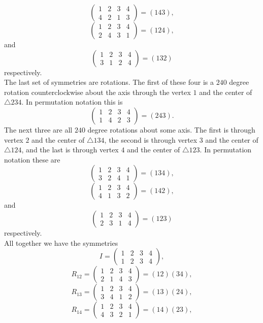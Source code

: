 \documentclass[11pt,a4paper]{article}
\begin{document}
\[\begin{pmatrix}1&2&3&4\\4&2&1&3\end{pmatrix} = (143),\]
\[\begin{pmatrix}1&2&3&4\\2&4&3&1\end{pmatrix} = (124),\]
and
\[\begin{pmatrix}1&2&3&4\\3&1&2&4\end{pmatrix} = (132)\]
respectively.\\
The last set of symmetries are rotations. The first of these four is a $240$ degree rotation counterclockwise about the axis through the vertex $1$ and the center of $\triangle 234$. In permutation notation this is
\[\begin{pmatrix}1&2&3&4\\1&4&2&3\end{pmatrix} = (243).\]
The next three are all $240$ degree rotations about some axis. The first is through vertex $2$ and the center of $\triangle 134$, the second is through vertex $3$ and the center of $\triangle 124$, and the last is through vertex $4$ and the center of $\triangle 123$. In permutation notation these are
\[\begin{pmatrix}1&2&3&4\\3&2&4&1\end{pmatrix} = (134),\]
\[\begin{pmatrix}1&2&3&4\\4&1&3&2\end{pmatrix} = (142),\]
and
\[\begin{pmatrix}1&2&3&4\\2&3&1&4\end{pmatrix} = (123)\]
respectively.\\
All together we have the symmetries
\[I = \begin{pmatrix}1&2&3&4\\1&2&3&4\end{pmatrix},\]
\[R_{12} = \begin{pmatrix}1&2&3&4\\2&1&4&3\end{pmatrix} = (12)(34),\]
\[R_{13} = \begin{pmatrix}1&2&3&4\\3&4&1&2\end{pmatrix} = (13)(24),\]
\[R_{14} = \begin{pmatrix}1&2&3&4\\4&3&2&1\end{pmatrix} = (14)(23),\]
\end{document}

